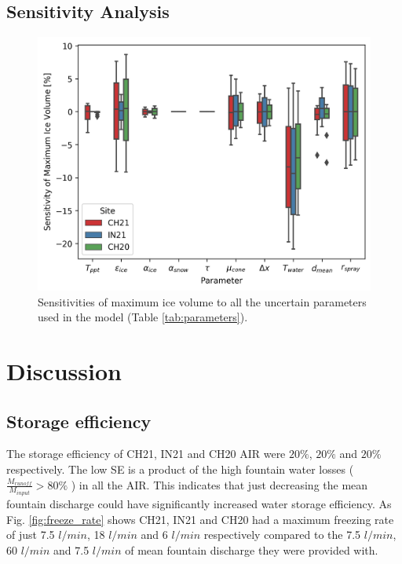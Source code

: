 \documentclass[utf8]{frontiersSCNS} %
\begin{document}
% 
% 

\subsection{Sensitivity Analysis}
\begin{figure} 
    \begin{center} 
    \includegraphics[width=10 cm]{Figures/sensitivities.jpg} 
\end{center}
\caption{Sensitivities of maximum ice volume to all the uncertain parameters used in the model (Table
\ref{tab:parameters}). } 
\label{fig:sensitivity} 
\end{figure}

\section{Discussion} 
\subsection{Storage efficiency}
The storage efficiency of CH21, IN21 and CH20 AIR were $20\%$, $20\%$ and $20\%$ respectively. The low SE is a product
of the high  fountain water losses ( $\frac{M_{runoff}}{M_{input}}> 80 \%$ ) in all the AIR. This indicates that just
decreasing the mean fountain discharge could have significantly increased water storage efficiency. As Fig.
\ref{fig:freeze_rate} shows CH21, IN21 and CH20 had a maximum freezing rate of just 7.5 $l/min$, 18 $l/min$ and 6
$l/min$ respectively compared to the 7.5 $l/min$, 60 $l/min$ and 7.5 $l/min$ of mean fountain discharge they were
provided with.
\end{document}
